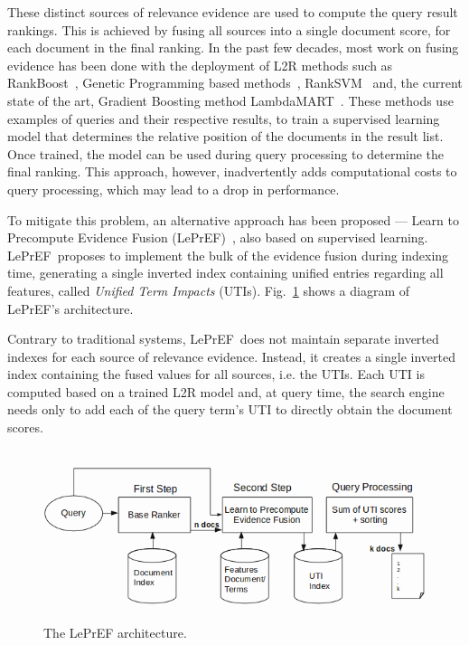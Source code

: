 \documentclass[preprint,12pt,3p]{elsarticle}
\begin{document}
These distinct sources of relevance evidence are used to compute the query result rankings. This is achieved by fusing all sources into a single document score, for each document in the final ranking. In the past few decades, most work on fusing evidence has been done with the deployment of L2R methods such as RankBoost~\cite{freund2003efficient}, Genetic Programming based methods~\cite{de2007combined, silva2009evolutionary}, RankSVM~\cite{joachims2002optimizing} and, the current state of the art, Gradient Boosting method LambdaMART~\cite{wu2010lambdamart}. These methods use examples of queries and their respective results, to train a supervised learning model that determines the relative position of the documents in the result list. Once trained, the model can be used during query processing to determine the final ranking. This approach, however, inadvertently adds computational costs to query processing, which may lead to a drop in performance.

\newcommand{\lepref}{LePrEF}

To mitigate this problem, an alternative approach has been proposed --- Learn to Precompute Evidence Fusion (\lepref)~\cite{costa2012lepref}, also based on supervised learning. \lepref\ proposes to implement the bulk of the evidence fusion during indexing time, generating a single inverted index containing unified entries regarding all features, called \textit{Unified Term Impacts} (UTIs). Fig.~\ref{fig:arq} shows a diagram of \lepref's architecture.

Contrary to traditional systems, \lepref\ does not maintain separate inverted indexes for each source of relevance evidence. Instead, it creates a single inverted index containing the fused values for all sources, i.e. the UTIs. Each UTI is computed based on a trained L2R model and, at query time, the search engine needs only to add each of the query term's UTI to directly obtain the document scores.

\begin{figure}
\begin{center}
\includegraphics[width=12cm, height=5cm]{im_arquitetura.png}
\caption{The LePrEF architecture. }
\label{fig:arq}
\end{center}
\end{figure}
\end{document}
